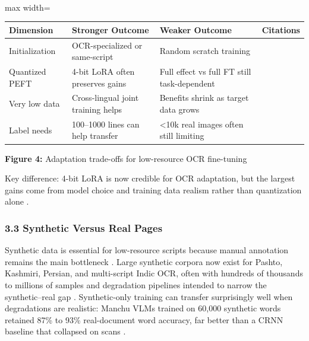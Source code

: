     
    \mbox{}\\
    \begin{adjustbox}{max width=\textwidth}
    \begin{tabular}{p{4.0cm} | p{4.0cm} | p{4.0cm} | p{4.0cm}}
    \hline
    Dimension & Stronger Outcome & Weaker Outcome & Citations \\
    \hline
    Initialization & OCR-specialized or same-script & Random scratch training & \cite{Faraz2026Designing} \cite{Manna2025Label-Free} \\
    Quantized PEFT & 4-bit LoRA often preserves gains & Full effect vs full FT still task-dependent & \cite{Wasfy2025QARI-OCR:} \cite{Elkousy2026Domain-Specific} \cite{Faraz2026Designing} \\
    Very low data & Cross-lingual joint training helps & Benefits shrink as target data grows & \cite{Al-Azzawi2026Cross-Lingual} \cite{Al-Azzawi2026Understanding} \\
    Label needs & 100–1000 lines can help transfer & <10k real images often still limiting & \cite{Al-Azzawi2026Cross-Lingual} \cite{Achyuth2026What} \\
    \hline
    \end{tabular}
    \end{adjustbox}
    
    
    \textbf{Figure 4:} Adaptation trade-offs for low-resource OCR fine-tuning
    
    
    Key difference: 4-bit LoRA is now credible for OCR adaptation, but the largest gains come from model choice and training data realism rather than quantization alone  \cite{Elkousy2026Domain-Specific} \cite{Bourne2025Scrambled} \cite{Hennara2025Baseer:}.
    
    
    \subsubsection*{3.3 Synthetic Versus Real Pages}
    
    
    Synthetic data is essential for low-resource scripts because manual annotation remains the main bottleneck  \cite{Malik2026synthocr-gen:} \cite{Saini2022OCR} \cite{Mahdi2026Persian} \cite{Guechaoui2026RefLAM:}. Large synthetic corpora now exist for Pashto, Kashmiri, Persian, and multi-script Indic OCR, often with hundreds of thousands to millions of samples and degradation pipelines intended to narrow the synthetic–real gap  \cite{Haq2026PsOCR:} \cite{Malik2026synthocr-gen:} \cite{Malik2026Koshur} \cite{Mahdi2026Persian} \cite{Malik2026600k-ks-ocr:}. Synthetic-only training can transfer surprisingly well when degradations are realistic: Manchu VLMs trained on 60,000 synthetic words retained 87\% to 93\% real-document word accuracy, far better than a CRNN baseline that collapsed on scans  \cite{Chung2025Finetuning} \cite{Chung2026Fine-tuning}.
    
